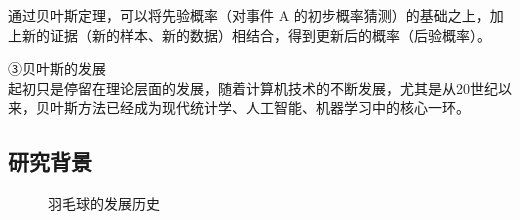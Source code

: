 \documentclass[12pt]{article}
\begin{document}
通过贝叶斯定理，可以将先验概率（对事件 A 的初步概率猜测）的基础之上，加上新的证据（新的样本、新的数据）相结合，得到更新后的概率（后验概率）。

③贝叶斯的发展 \\
起初只是停留在理论层面的发展，随着计算机技术的不断发展，尤其是从20世纪以来，贝叶斯方法已经成为现代统计学、人工智能、机器学习中的核心一环。


\subsection{研究背景}

\begin{figure}[h]
	\centering
	\caption{羽毛球的发展历史}
	\label{fig:histoys}
\end{figure}
\end{document}
